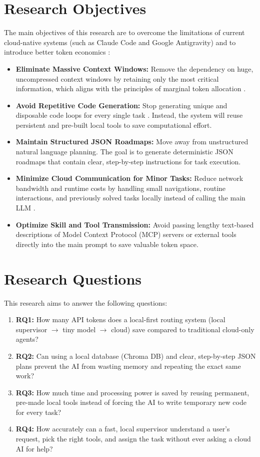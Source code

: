 \section{Research Objectives}
The main objectives of this research are to overcome the limitations of current cloud-native systems (such as Claude Code and Google Antigravity)\cite{anthropic_claude_code_works, google_antigravity_ide} and to introduce better token economics \cite{token_economics, ai_tokenomics}:\\
\begin{itemize}
\item \textbf{Eliminate Massive Context Windows:} Remove the dependency on huge, uncompressed context windows by retaining only the most critical information, which aligns with the principles of marginal token allocation \cite{marginal_token}.
\item \textbf{Avoid Repetitive Code Generation:} Stop generating unique and disposable code loops for every single task \cite{claude_code_dive}. Instead, the system will reuse persistent and pre-built local tools to save computational effort.
\item \textbf{Maintain Structured JSON Roadmaps:} Move away from unstructured natural language planning. The goal is to generate deterministic JSON roadmaps that contain clear, step-by-step instructions for task execution.
\item \textbf{Minimize Cloud Communication for Minor Tasks:} Reduce network bandwidth and runtime costs by handling small navigations, routine interactions, and previously solved tasks locally instead of calling the main LLM \cite{efficient_agents}.
\item \textbf{Optimize Skill and Tool Transmission:} Avoid passing lengthy text-based descriptions of Model Context Protocol (MCP) servers or external tools directly into the main prompt to save valuable token space.
\end{itemize}

\section{Research Questions}
This research aims to answer the following questions:\\
\begin{enumerate}
    \item \textbf{RQ1:} How many API tokens does a local-first routing system (local supervisor $\rightarrow$ tiny model $\rightarrow$ cloud) save compared to traditional cloud-only agents?
    \item \textbf{RQ2:} Can using a local database (Chroma DB) and clear, step-by-step JSON plans prevent the AI from wasting memory and repeating the exact same work?
    \item \textbf{RQ3:} How much time and processing power is saved by reusing permanent, pre-made local tools instead of forcing the AI to write temporary new code for every task?
    \item \textbf{RQ4:} How accurately can a fast, local supervisor understand a user's request, pick the right tools, and assign the task without ever asking a cloud AI for help?
\end{enumerate}

